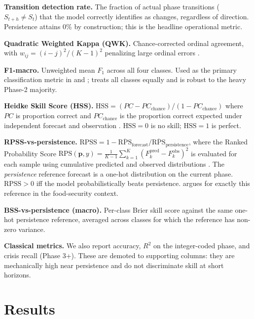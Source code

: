 \documentclass[11pt,letterpaper]{article}
\begin{document}
\textbf{Transition detection rate.} The fraction of actual phase transitions (\ $S_{t+h} \neq S_t$) that the model correctly identifies as changes, regardless of direction. Persistence attains 0\% by construction; this is the headline operational metric.

\textbf{Quadratic Weighted Kappa (QWK).} Chance-corrected ordinal agreement, with $w_{ij} = (i-j)^2/(K-1)^2$ penalizing large ordinal errors \citep{ben2008, martini2022}.

\textbf{F1-macro.} Unweighted mean $F_1$ across all four classes. Used as the primary classification metric in \citet{andree2022} and \citet{busker2024}; treats all classes equally and is robust to the heavy Phase-2 majority.

\textbf{Heidke Skill Score (HSS).} $\text{HSS} = (PC - PC_{\text{chance}})/(1 - PC_{\text{chance}})$ where $PC$ is proportion correct and $PC_{\text{chance}}$ is the proportion correct expected under independent forecast and observation \citep{mason2008}. $\text{HSS} = 0$ is no skill; $\text{HSS} = 1$ is perfect.

\textbf{RPSS-vs-persistence.} $\text{RPSS} = 1 - \overline{\text{RPS}}_{\text{forecast}} / \overline{\text{RPS}}_{\text{persistence}}$, where the Ranked Probability Score $\text{RPS}(\boldsymbol{p}, y) = \frac{1}{K-1} \sum_{k=1}^{K} (F_k^{\text{pred}} - F_k^{\text{obs}})^2$ is evaluated for each sample using cumulative predicted and observed distributions \citep{weigel2007}. The \emph{persistence} reference forecast is a one-hot distribution on the current phase. $\text{RPSS} > 0$ iff the model probabilistically beats persistence. \citet{zhou2023} argues for exactly this reference in the food-security context.

\textbf{BSS-vs-persistence (macro).} Per-class Brier skill score against the same one-hot persistence reference, averaged across classes for which the reference has non-zero variance.

\textbf{Classical metrics.} We also report accuracy, $R^2$ on the integer-coded phase, and crisis recall (Phase 3+). These are demoted to supporting columns: they are mechanically high near persistence and do not discriminate skill at short horizons.


\section{Results}\label{sec:results}
\end{document}
